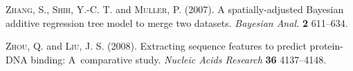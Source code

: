 \documentclass[aoas,nameyear,dvips]{arximspdf}
\begin{document}
\begin{thebibliography}{99}
\textsc{Zhang}, S., \textsc{Shih}, Y.-C. T. and \textsc{Muller}, P.  (2007). A spatially-adjusted {B}ayesian additive regression tree
  model to merge two datasets. \textit{Bayesian Anal.} \textbf{2} 611--634.

\textsc{Zhou}, Q. and \textsc{Liu}, J. S.  (2008). Extracting
  sequence features to predict protein-{DNA} binding: A~comparative
  study. \textit{Nucleic Acids Research} \textbf{36} 4137--4148.

\end{thebibliography}

\printaddresses
\end{document}
